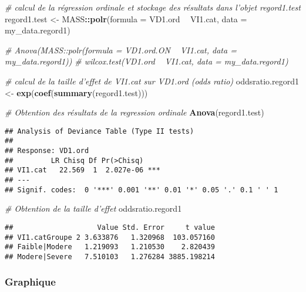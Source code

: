 \documentclass[
]{book}
\newenvironment{Shaded}{\begin{snugshade}}{\end{snugshade}}
\newcommand{\CommentTok}[1]{\textcolor[rgb]{0.56,0.35,0.01}{\textit{#1}}}
\newcommand{\DataTypeTok}[1]{\textcolor[rgb]{0.13,0.29,0.53}{#1}}
\newcommand{\KeywordTok}[1]{\textcolor[rgb]{0.13,0.29,0.53}{\textbf{#1}}}
\newcommand{\NormalTok}[1]{#1}
\newcommand{\OperatorTok}[1]{\textcolor[rgb]{0.81,0.36,0.00}{\textbf{#1}}}
\newcommand{\StringTok}[1]{\textcolor[rgb]{0.31,0.60,0.02}{#1}}
\begin{document}
\begin{Shaded}
\begin{Highlighting}[]
\CommentTok{# calcul de la régression ordinale et stockage des résultats dans l’objet regord1.test}
\NormalTok{regord1.test <-}\StringTok{ }\NormalTok{MASS}\OperatorTok{::}\KeywordTok{polr}\NormalTok{(}\DataTypeTok{formula =}\NormalTok{ VD1.ord }\OperatorTok{~}\StringTok{ }\NormalTok{VI1.cat, }
                           \DataTypeTok{data =}\NormalTok{ my_data.regord1)}

\CommentTok{# Anova(MASS::polr(formula = VD1.ord.ON ~ VI1.cat, data = my_data.regord1))}
\CommentTok{# wilcox.test(VD1.ord ~ VI1.cat, data = my_data.regord1)}

\CommentTok{# calcul de la taille d'effet de VI1.cat sur VD1.ord (odds ratio)}
\NormalTok{oddsratio.regord1 <-}\StringTok{ }\KeywordTok{exp}\NormalTok{(}\KeywordTok{coef}\NormalTok{(}\KeywordTok{summary}\NormalTok{(regord1.test)))}

\CommentTok{# Obtention des résultats de la regression ordinale}
\KeywordTok{Anova}\NormalTok{(regord1.test)}
\end{Highlighting}
\end{Shaded}

\begin{verbatim}
## Analysis of Deviance Table (Type II tests)
## 
## Response: VD1.ord
##         LR Chisq Df Pr(>Chisq)    
## VI1.cat   22.569  1  2.027e-06 ***
## ---
## Signif. codes:  0 '***' 0.001 '**' 0.01 '*' 0.05 '.' 0.1 ' ' 1
\end{verbatim}

\begin{Shaded}
\begin{Highlighting}[]
\CommentTok{# Obtention de la taille d'effet}
\NormalTok{oddsratio.regord1}
\end{Highlighting}
\end{Shaded}

\begin{verbatim}
##                    Value Std. Error     t value
## VI1.catGroupe 2 3.633876   1.320968  103.057160
## Faible|Modere   1.219093   1.210530    2.820439
## Modere|Severe   7.510103   1.276284 3885.198214
\end{verbatim}

\hypertarget{graphique-17}{%
\subsubsection{Graphique}\label{graphique-17}}
\end{document}
